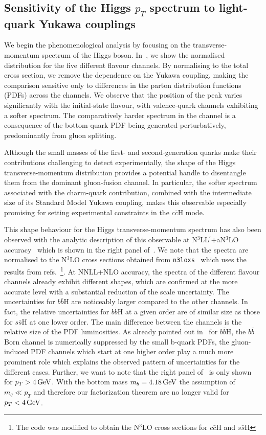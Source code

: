 \documentclass[11pt,a4paper]{article}
\begin{document}
\subsection{Sensitivity of the Higgs $p_T$ spectrum to light-quark Yukawa couplings}
We begin the phenomenological analysis by focusing on the transverse-momentum spectrum of the Higgs boson. In~, we show the normalised distribution for the five different flavour channels. By normalising to the total cross section, we remove the dependence on the Yukawa coupling, making the comparison sensitive only to differences in the parton distribution functions (PDFs) across the channels. We observe that the position of the peak varies significantly with the initial-state flavour, with valence-quark channels exhibiting a softer spectrum. The comparatively harder spectrum in the \bbH{} channel is a consequence of the bottom-quark PDF being generated perturbatively, predominantly from gluon splitting.

Although the small masses of the first- and second-generation quarks make their contributions challenging to detect experimentally, the shape of the Higgs transverse-momentum distribution provides a potential handle to disentangle them from the dominant gluon-fusion channel. In particular, the softer spectrum associated with the charm-quark contribution, combined with the intermediate size of its Standard Model Yukawa coupling, makes this observable especially promising for setting experimental constraints in the $c\bar c \text{H}$ mode.

This shape behaviour for the Higgs transverse-momentum spectrum has also been observed with the analytic description of this observable at N$^3$LL$^{\prime}$+aN$^3$LO accuracy~\cite{Cal:2023mib} which is shown in the right panel of~.
We note that the spectra are normalised to the N$^3$LO cross sections obtained from \texttt{n3loxs}~\cite{Baglio:2022wzu} which uses the results from refs.~\cite{duhr:2019kwi,Duhr:2020kzd}\footnote{The code was modified to obtain the N$^3$LO cross sections for  $c\bar c \text{H}$ and  $s\bar s \text{H}$}.
At NNLL+NLO accuracy, the spectra of the different flavour channels already exhibit different shapes, which are confirmed at the more accurate \nnnres{} level with a substantial reduction of the scale uncertainty. The uncertainties for $b\bar b \text{H}$ are noticeably larger compared to the other channels.
In fact, the relative uncertainties for $b\bar b \text{H}$ at
a given order are of similar size as those for $s\bar s \text{H}$ at one lower order.
The main difference between the channels is the relative size of the PDF luminosities.
As already pointed out in~ for $b\bar b \text{H}$, the $b\bar b$ Born channel is numerically suppressed by the small b-quark PDFs, the
gluon-induced PDF channels which start at one higher order play a much more prominent role which explains the observed pattern of uncertainties for the different cases. Further, we want to note that the right panel of~ is only shown for $p_T> 4\, \mathrm{GeV}$. With
the bottom mass $m_b = 4.18\, \mathrm{GeV}$ the assumption of $m_q \ll p_T$ and therefore our factorization
theorem are no longer valid for $p_T<4\, \mathrm{GeV}$.
\end{document}
